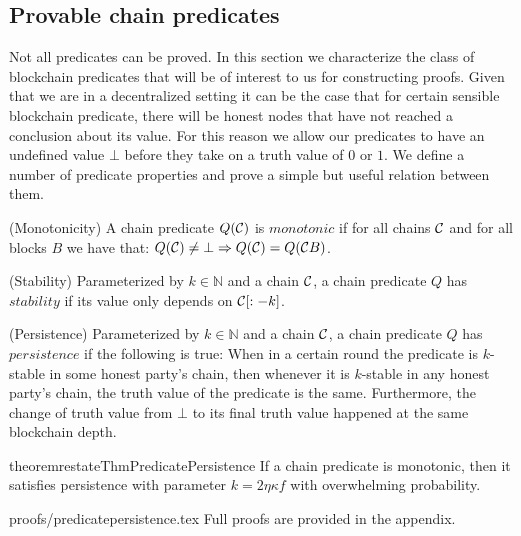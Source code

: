 \subsection{Provable chain predicates}

Not all predicates can be proved. In this section we characterize the class of
blockchain predicates that will be of interest to us for constructing proofs.
Given that we are in a decentralized setting it can be the case that for certain
sensible blockchain predicate, there will be honest nodes that have not reached
a conclusion about its value. For this reason we allow our predicates to have an
undefined value $\bot$ before they take on a truth value of $0$ or $1$. We
define a number of predicate properties and prove a simple but useful relation
between them.

\begin{definition}{(Monotonicity)}
    A chain predicate $Q(\mathcal{C})$ is $\textit{monotonic}$ if for all chains
    $\mathcal{C}$ and for all blocks $B$ we have that:
    $Q(\mathcal{C}) \neq \bot \Rightarrow Q(\mathcal{C}) = Q(\mathcal{C} B)$.

 {(Stability)}
    Parameterized by $k \in \mathbb{N}$ and a chain $\mathcal{C}$, a chain predicate
    $Q$ has $\textit{stability}$ if its value only depends on $\mathcal{C}[:-k]$.

{(Persistence)}
    Parameterized by $k \in \mathbb{N}$ and a chain $\mathcal{C}$, a chain predicate
    $Q$ has $\textit{persistence}$ if the following is true: When in a certain
    round the predicate is $k$-stable in some honest party's chain, then
    whenever it is $k$-stable in any honest party's chain, the truth value of
    the predicate is the same. Furthermore, the change of truth value from
    $\bot$ to its final truth value happened at the same blockchain depth.
\end{definition}

\begin{restatable}{theorem}{restateThmPredicatePersistence}
    If a chain predicate is monotonic, then it satisfies persistence with
    parameter $k = 2\eta \kappa f$ with overwhelming probability.
\end{restatable}
\ifonecolumn
    {proofs/predicatepersistence.tex}
\else
    Full proofs are provided in the appendix.
\fi
